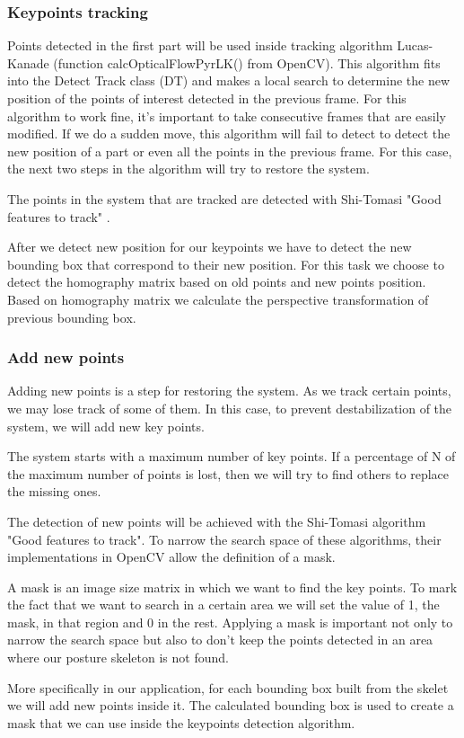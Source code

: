 \subsubsection{Keypoints tracking}
\par Points detected in the first part will be used inside tracking algorithm Lucas-Kanade \cite{Lucas:1981:IIR:1623264.1623280} (function calcOpticalFlowPyrLK() from OpenCV). This algorithm fits into the Detect Track  class (DT) and makes a local search to determine the new position of the points of interest detected in the previous frame. For this algorithm to work fine, it's important to take consecutive frames that are easily modified. If we do a sudden move, this algorithm will fail to detect to detect the new position of a part or even all the points in the previous frame. For this case, the next two steps in the algorithm will try to restore the system. 
\par The points in the system that are tracked are detected with Shi-Tomasi "Good features to track" \cite{323798}. 
\par After we detect new position for our keypoints we have to detect the new bounding box that correspond to their new position. For this task we choose to detect the homography matrix based on old points and new points position. Based on homography matrix we calculate the perspective transformation of previous bounding box.
\subsubsection{Add new points}
\par Adding new points is a step for restoring the system. As we track certain points, we may lose track of some of them. In this case, to prevent destabilization of the system, we will add new key points.
\par The system starts with a maximum number of key points. If a percentage of N of the maximum number of points is lost, then we will try to find others to replace the missing ones. 
\par The detection of new points will be achieved with the Shi-Tomasi algorithm "Good features to track". To narrow the search space of these algorithms, their implementations in OpenCV allow the definition of a mask. \par A mask is an image size matrix in which we want to find the key points. To mark the fact that we want to search in a certain area we will set the value of 1, the mask, in that region and 0 in the rest. Applying a mask is important not only to narrow the search space but also to don\mbox{'}t keep the points detected in an area where our posture skeleton is not found. 
\par More specifically in our application, for each bounding box built from the skelet we will add new points inside it. The calculated bounding box is used to create a mask that we can use inside the keypoints detection algorithm.
